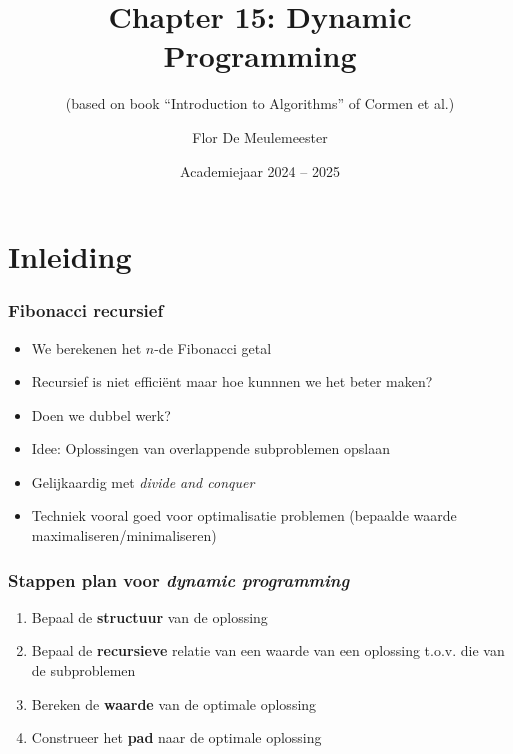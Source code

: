 \documentclass
   [kulak] %
   {kulakbeamer}
\title[Chapter 15: Dynamic Programming]{Chapter 15: Dynamic Programming}
\subtitle{(based on book “Introduction to Algorithms” of Cormen et al.)}
\author[]{Flor De Meulemeester}
\institute[Kulak]{KU Leuven Kulak}
\date{Academiejaar 2024 -- 2025}
\begin{document}
\begin{titleframe}
\titlepage
\end{titleframe}

\begin{outlineframe}[Overzicht]
\tableofcontents
\end{outlineframe}


\section{Inleiding}

\begin{frame}
\frametitle{Fibonacci recursief}
    \begin{itemize}
        \item<1-> We berekenen het $n$-de Fibonacci getal
        \item<2-> Recursief is niet efficiënt maar hoe kunnnen we het beter maken?
        \item<2-> Doen we dubbel werk?
        \item<3-> Idee: Oplossingen van overlappende subproblemen opslaan
        \item<4-> Gelijkaardig met \textit{divide and conquer}
        \item<5-> Techniek vooral goed voor optimalisatie problemen (bepaalde waarde maximaliseren/minimaliseren)
    \end{itemize}
\end{frame}

\begin{frame}
\frametitle{Stappen plan voor \textit{dynamic programming}}
    \begin{enumerate}
        \item Bepaal de \textbf{structuur} van de oplossing
        \item Bepaal de \textbf{recursieve} relatie van een waarde van een oplossing t.o.v. die van de subproblemen
        \item Bereken de \textbf{waarde} van de optimale oplossing
        \item Construeer het \textbf{pad} naar de optimale oplossing
    \end{enumerate}
\end{frame}
\end{document}
